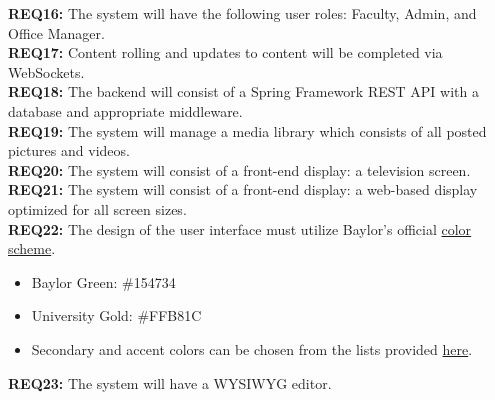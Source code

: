 \textbf{REQ16:} The system will have the following user roles: Faculty, Admin, and Office Manager. \\
\textbf{REQ17:} Content rolling and updates to content will be completed via WebSockets. \\
\textbf{REQ18:} The backend will consist of a Spring Framework REST API with a database and appropriate middleware. \\
\textbf{REQ19:} The system will manage a media library which consists of all posted pictures and videos. \\
\textbf{REQ20:} The system will consist of a front-end display: a television screen. \\
\textbf{REQ21:} The system will consist of a front-end display: a web-based display optimized for all screen sizes. \\
\textbf{REQ22:} The design of the user interface must utilize Baylor's official \href{https://brand.web.baylor.edu/brand-standards/official-brand-colors}{color scheme}.
\begin{itemize}
    \item Baylor Green: \#154734
    \item University Gold: \#FFB81C
    \item Secondary and accent colors can be chosen from the lists provided \href{https://brand.web.baylor.edu/brand-guidelines/design-colors}{here}.
\end{itemize}
\textbf{REQ23:} The system will have a WYSIWYG editor.